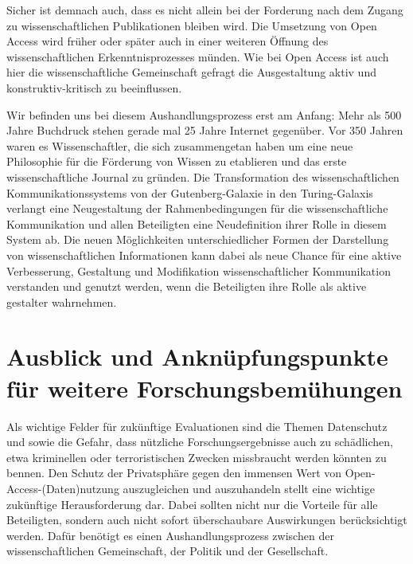 Sicher ist demnach auch, dass es nicht allein bei der Forderung nach dem Zugang zu wissenschaftlichen Publikationen bleiben wird. Die Umsetzung von Open Access wird früher oder später auch in einer weiteren Öffnung des wissenschaftlichen Erkenntnisprozesses münden. Wie bei Open Access ist auch hier die wissenschaftliche Gemeinschaft gefragt die Ausgestaltung aktiv und konstruktiv-kritisch zu beeinflussen.

Wir befinden uns bei diesem Aushandlungsprozess erst am Anfang: Mehr als 500 Jahre Buchdruck stehen gerade mal 25 Jahre Internet gegenüber. Vor 350 Jahren waren es Wissenschaftler, die sich zusammengetan haben um eine neue Philosophie für die Förderung von Wissen zu etablieren und das erste wissenschaftliche Journal zu gründen. Die Transformation des wissenschaftlichen Kommunikationssystems von der Gutenberg-Galaxie in den Turing-Galaxis verlangt eine Neugestaltung der Rahmenbedingungen für die wissenschaftliche Kommunikation und allen Beteiligten eine Neudefinition ihrer Rolle in diesem System ab. Die neuen Möglichkeiten unterschiedlicher Formen der Darstellung von wissenschaftlichen Informationen kann dabei als neue Chance für eine aktive Verbesserung, Gestaltung und Modifikation wissenschaftlicher Kommunikation verstanden und genutzt werden, wenn die Beteiligten ihre Rolle als aktive gestalter wahrnehmen.

\section{Ausblick und Anknüpfungspunkte für weitere Forschungsbemühungen}

Als wichtige Felder für zukünftige Evaluationen sind die Themen Datenschutz und sowie die Gefahr, dass nützliche Forschungsergebnisse auch zu schädlichen, etwa kriminellen oder terroristischen Zwecken missbraucht werden könnten \cite{Fritsch_2015} zu bennen. Den Schutz der Privatsphäre gegen den immensen Wert von Open-Access-(Daten)nutzung auszugleichen und auszuhandeln stellt eine wichtige zukünftige Herausforderung dar. Dabei sollten nicht nur die Vorteile für alle Beteiligten, sondern auch nicht sofort überschaubare Auswirkungen berücksichtigt werden. Dafür benötigt es einen Aushandlungsprozess zwischen der wissenschaftlichen Gemeinschaft, der Politik und der Gesellschaft.

